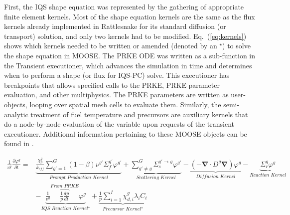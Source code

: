 \documentclass{elsarticle}
\newcommand{\bs}[1]{\mathbf{#1}}
\renewcommand{\div}{\bs{\nabla}\! \cdot \!}
\newcommand{\grad}{\bs{\nabla}}
\newcommand{\eqt}[1]{Eq.~(\ref{#1})}                     %
\newcommand{\keff}{k_\textit{eff}}
\newcommand{\iqspc}{IQS-PC\xspace}
\begin{document}
First, the IQS shape equation was represented by the gathering of appropriate finite element kernels. Most of the shape equation kernels are the same as the flux kernels already implemented in Rattlesnake for its standard diffusion (or transport) solution, and only two kernels had to be modified. \eqt{eq:kernels} shows which kernels needed to be written or amended (denoted by an $^\star$) to solve the shape equation in MOOSE. The PRKE ODE was written as a sub-function in the Transient executioner, which advances the simulation in time and determines when to perform a shape (or flux for \iqspc) solve. This executioner has breakpoints that allows specified calls to the PRKE, PRKE parameter evaluation, and other multiphysics. The PRKE parameters are written as user-objects, looping over spatial mesh cells to evaluate them. Similarly, the semi-analytic treatment of fuel temperature and precursors are auxiliary kernels that do a node-by-node evaluation of the variable upon requests of the transient executioner. Additional information pertaining to these MOOSE objects can be found in \cite{PrinceTR2016}.

\begin{align}
\frac{1}{v^g}\frac{\partial\varphi^g}{\partial t}=&\underbrace{\frac{\chi_p^g}{\keff} \sum_{g'=1}^G (1-\beta) \nu^{g'} \Sigma_f^{g'} \varphi^{g'}}_{\textit{Prompt Production Kernel}} + \underbrace{\sum_{g'\neq g}^G\Sigma_s^{g'\to g} \varphi^{g'}}_{\textit{Scattering Kernel}} - \underbrace{\left( -\div D^g \grad \right)\varphi^g}_{\textit{Diffusion Kernel}} - \underbrace{\Sigma_r^g\varphi^g}_{\textit{Reaction Kernel}} \nonumber \\
& - \underbrace{\frac{1}{v^g} \boxed{\overbrace{\frac{1}{p}\frac{dp}{dt}}^{\textit{From PRKE}}}\varphi^g}_{\textit{IQS Reaction Kernel}^\star}+\underbrace{\frac{1}{p}\sum_{i=1}^I\chi_{d,i}^g\lambda_iC_i}_{\textit{Precursor Kernel}^\star}
\label{eq:kernels}
\end{align}


\end{document}
